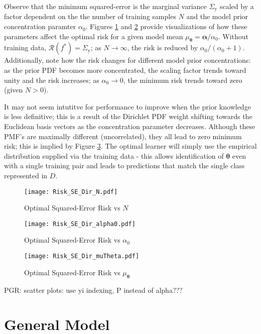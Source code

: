 \documentclass[12pt]{report}
\DeclareMathOperator{\yrm}{\mathrm{y}}
\begin{document}
Observe that the minimum squared-error is the marginal variance $\Sigma_{\yrm}$ scaled by a factor dependent on the the number of training samples $N$ and the model prior concentration paramter $\alpha_0$. Figures \ref{fig:Risk_SE_Dir_N} and \ref{fig:Risk_SE_Dir_alpha0} provide visualizations of how these parameters affect the optimal risk for a given model mean $\mu_{\bm{\theta}} = \bm{\alpha}/\alpha_0$. Without training data, $\mathcal{R}(f^*) = \Sigma_{\yrm}$; as $N \to \infty$, the risk is reduced by $\alpha_0 / (\alpha_0+1)$. Additionally, note how the risk changes for different model prior concentrations: as the prior PDF becomes more concentrated, the scaling factor trends toward unity and the risk increases; as $\alpha_0 \to 0$, the minimum risk trends toward zero (given $N > 0$). 

It may not seem intutitve for performance to improve when the prior knowledge is less definitive; this is a result of the Dirichlet PDF weight shifting towards the Euclidean basis vectors as the concentration parameter decreases. Although these PMF's are maximally different (uncorrelated), they all lead to zero minimum risk; this is implied by Figure \ref{fig:Risk_SE_Dir_muTheta}. The optimal learner will simply use the empirical distribution supplied via the training data - this allows identification of $\bm{\theta}$ even with a single training pair and leads to predictions that match the single class represented in $D$.




\begin{figure}
\centering
\texttt{[image: Risk\_SE\_Dir\_N.pdf]}
\caption{Optimal Squared-Error Risk vs $N$}
\label{fig:Risk_SE_Dir_N}
\end{figure}

\begin{figure}
\centering
\texttt{[image: Risk\_SE\_Dir\_alpha0.pdf]}
\caption{Optimal Squared-Error Risk vs $\alpha_0$}
\label{fig:Risk_SE_Dir_alpha0}
\end{figure}

\begin{figure}
\centering
\texttt{[image: Risk\_SE\_Dir\_muTheta.pdf]}
\caption{Optimal Squared-Error Risk vs $\mu_{\bm{\theta}}$}
\label{fig:Risk_SE_Dir_muTheta}
\end{figure}

PGR: scatter plots: use yi indexing, P instead of alpha???



\section{General Model}
\end{document}
